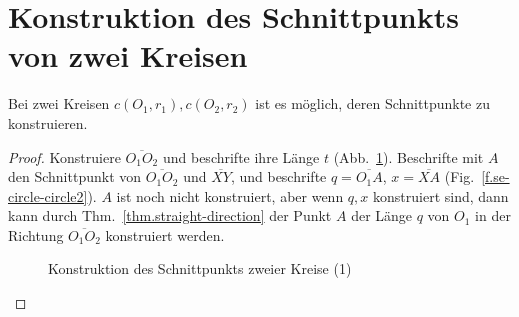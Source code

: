 \section{Konstruktion des Schnittpunkts von zwei Kreisen}\label{s.two-circles}

\begin{theorem}
Bei zwei Kreisen $c(O_1,r_1), c(O_2,r_2)$ ist es möglich, deren Schnittpunkte zu konstruieren.
\end{theorem}

\begin{proof}
Konstruiere $\overline{O_1O_2}$ und beschrifte ihre Länge $t$ (Abb.~\ref{f.se-circle-circle1}).
Beschrifte mit $A$ den Schnittpunkt von $\overline{O_1O_2}$ und $\overline{XY}$, und beschrifte $q=\overline{O_1A}$, $x=\overline{XA}$ (Fig.~\ref{f.se-circle-circle2}). $A$ ist noch nicht konstruiert, aber wenn $q,x$ konstruiert sind, dann kann durch Thm.~\ref{thm.straight-direction} der Punkt $A$ der Länge $q$ von $O_1$ in der Richtung $\overline{O_1O_2}$ konstruiert werden.

\begin{figure}[t]
\begin{center}
\end{center}
\caption{Konstruktion des Schnittpunkts zweier Kreise (1)}\label{f.se-circle-circle1}
\end{figure}


\end{proof}
